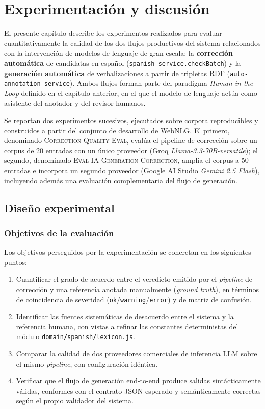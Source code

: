 \chapter{Experimentación y discusión}
\label{cha:experimentacion}

El presente capítulo describe los experimentos realizados para evaluar
cuantitativamente la calidad de los dos flujos productivos del sistema
relacionados con la intervención de modelos de lenguaje de gran escala: la
\textbf{corrección automática} de candidatas en español
(\texttt{spanish-service.checkBatch}) y la \textbf{generación automática} de
verbalizaciones a partir de tripletas RDF (\texttt{auto-annotation-service}).
Ambos flujos forman parte del paradigma \textit{Human-in-the-Loop} definido en
el capítulo anterior, en el que el modelo de lenguaje actúa como asistente del
anotador y del revisor humanos.

Se reportan dos experimentos sucesivos, ejecutados sobre corpora reproducibles
y construidos a partir del conjunto de desarrollo de WebNLG. El primero,
denominado \textsc{Correction-Quality-Eval}, evalúa el pipeline de corrección
sobre un corpus de 20 entradas con un único proveedor (Groq
\textit{Llama-3.3-70B-versatile}); el segundo, denominado
\textsc{Eval-IA-Generation-Correction}, amplía el corpus a 50 entradas e
incorpora un segundo proveedor (Google AI Studio \textit{Gemini 2.5 Flash}),
incluyendo además una evaluación complementaria del flujo de generación.

\section{Diseño experimental}

\subsection{Objetivos de la evaluación}

Los objetivos perseguidos por la experimentación se concretan en los siguientes
puntos:

\begin{enumerate}
	\item Cuantificar el grado de acuerdo entre el veredicto emitido por el
	      \textit{pipeline} de corrección y una referencia anotada manualmente
	      (\textit{ground truth}), en términos de coincidencia de severidad
	      (\texttt{ok}/\texttt{warning}/\texttt{error}) y de matriz de confusión.
	\item Identificar las fuentes sistemáticas de desacuerdo entre el sistema y la
	      referencia humana, con vistas a refinar las constantes deterministas del módulo
	      \texttt{domain/spanish/lexicon.js}.
	\item Comparar la calidad de dos proveedores comerciales de inferencia LLM sobre el
	      mismo \textit{pipeline}, con configuración idéntica.
	\item Verificar que el flujo de generación end-to-end produce salidas sintácticamente
	      válidas, conformes con el contrato JSON esperado y semánticamente correctas
	      según el propio validador del sistema.
\end{enumerate}

